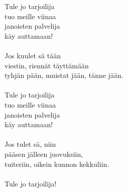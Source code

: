 
            Tule jo tarjoilija \\
            tuo meille viinaa \\
            janoisten palvelija \\
            käy auttamaan! \\
\hspace{10mm} \\
            Jos kuulet sä tään \\
            viestin, riennät täyttämään \\
            tyhjän pään, muistat jään, tänne jään. \\
\hspace{10mm} \\
            Tule jo tarjoilija \\
            tuo meille viinaa \\
            janoisten palvelija \\
            käy auttamaan! \\
\hspace{10mm} \\
            Jos tulet sä, niin \\
            pääsen jälleen juovuksiin, \\
            tuiteriin, oikein kunnon kekkuliin. \\
\hspace{10mm} \\
            Tule jo tarjoilija! \\
